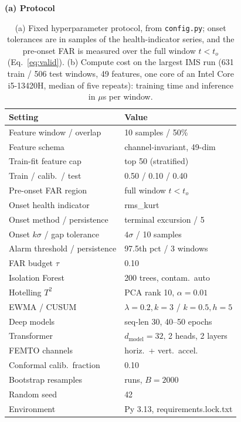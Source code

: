 \begin{table}[t] \footnotesize
	\begin{center}
	\caption{(a) Fixed hyperparameter protocol, from \texttt{config.py}; onset tolerances are in samples of the health-indicator series, and the pre-onset FAR is measured over the full window $t < t_o$ (Eq.~\ref{eq:valid}). (b) Compute cost on the largest IMS run (631 train / 506 test windows, 49 features, one core of an Intel Core i5-13420H, median of five repeats): training time and inference in $\mu$s per window.}
	\label{tab:hyperparams}
	\textbf{(a) Protocol}\\[2pt]
\begin{tabular}{l l}
		\hline \hline
		\textbf{Setting} & \textbf{Value} \\
		\hline
		Feature window / overlap & 10 samples / 50\% \\
		Feature schema & channel-invariant, 49-dim \\
		Train-fit feature cap & top 50 (stratified) \\
		Train / calib.\ / test & 0.50 / 0.10 / 0.40 \\
		Pre-onset FAR region & full window $t < t_o$ \\
		Onset health indicator & rms\_kurt \\
		Onset method / persistence & terminal excursion / 5 \\
		Onset $k\sigma$ / gap tolerance & $4\sigma$ / 10 samples \\
		Alarm threshold / persistence & 97.5th pct / 3 windows \\
		FAR budget $\tau$ & 0.10 \\
		Isolation Forest & 200 trees, contam.\ auto \\
		Hotelling $T^2$ & PCA rank 10, $\alpha=0.01$ \\
		EWMA / CUSUM & $\lambda{=}0.2, k{=}3$ / $k{=}0.5, h{=}5$ \\
		Deep models & seq-len 30, 40--50 epochs \\
		Transformer & $d_{\text{model}}{=}32$, 2 heads, 2 layers \\
		FEMTO channels & horiz.\ + vert.\ accel. \\
		Conformal calib.\ fraction & 0.10 \\
		Bootstrap resamples & runs, $B{=}2000$ \\
		Random seed & 42 \\
		Environment & Py 3.13, requirements.lock.txt \\
		\hline \hline
	\end{tabular}

\end{center}
\end{table}
